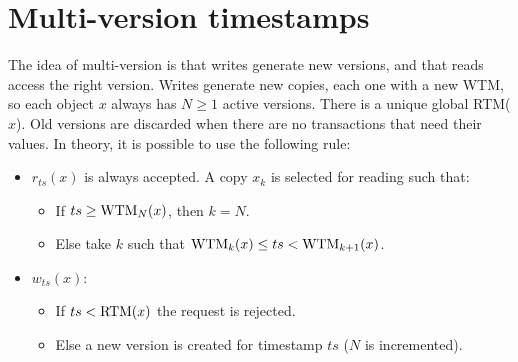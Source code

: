 \documentclass[12pt, a4paper]{report}
\begin{document}
    \section{Multi-version timestamps}
    The idea of multi-version is that writes generate new versions, and that reads access the right version. Writes generate new copies, each one with a new WTM, so each object $x$ 
    always has $N \geq 1$ active versions. There is a unique global RTM($x$). Old versions are discarded when there are no transactions that need their values. 
    In theory, it is possible to use the following rule: 
    \begin{itemize}
        \item $r_{ts}(x)$ is always accepted. A copy $x_k$ is selected for reading such that:
            \begin{itemize}
                \item If $ts \geq \textnormal{WTM}_N(x)$, then $k=N$.
                \item Else take $k$ such that $\textnormal{WTM}_k(x) \leq ts < \textnormal{WTM}_{k+1}(x)$. 
            \end{itemize}
        \item $w_{ts}(x)$: 
            \begin{itemize}
                \item If $ts < \textnormal{RTM}(x)$ the request is rejected. 
                \item Else a new version is created for timestamp $ts$ ($N$ is incremented). 
            \end{itemize}
    \end{itemize}
\end{document}

